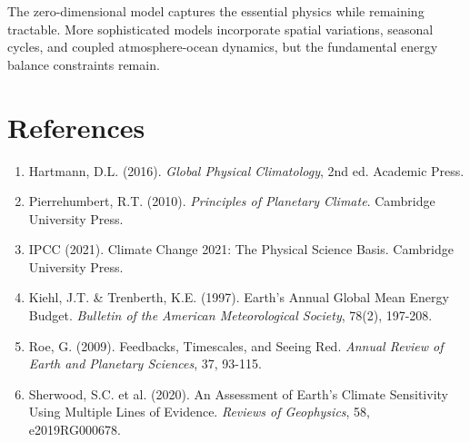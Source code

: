 \documentclass[11pt,a4paper]{article}
\begin{document}
The zero-dimensional model captures the essential physics while remaining tractable. More sophisticated models incorporate spatial variations, seasonal cycles, and coupled atmosphere-ocean dynamics, but the fundamental energy balance constraints remain.

\section{References}

\begin{enumerate}
    \item Hartmann, D.L. (2016). \textit{Global Physical Climatology}, 2nd ed. Academic Press.

    \item Pierrehumbert, R.T. (2010). \textit{Principles of Planetary Climate}. Cambridge University Press.

    \item IPCC (2021). Climate Change 2021: The Physical Science Basis. Cambridge University Press.

    \item Kiehl, J.T. \& Trenberth, K.E. (1997). Earth's Annual Global Mean Energy Budget. \textit{Bulletin of the American Meteorological Society}, 78(2), 197-208.

    \item Roe, G. (2009). Feedbacks, Timescales, and Seeing Red. \textit{Annual Review of Earth and Planetary Sciences}, 37, 93-115.

    \item Sherwood, S.C. et al. (2020). An Assessment of Earth's Climate Sensitivity Using Multiple Lines of Evidence. \textit{Reviews of Geophysics}, 58, e2019RG000678.
\end{enumerate}
\end{document}
